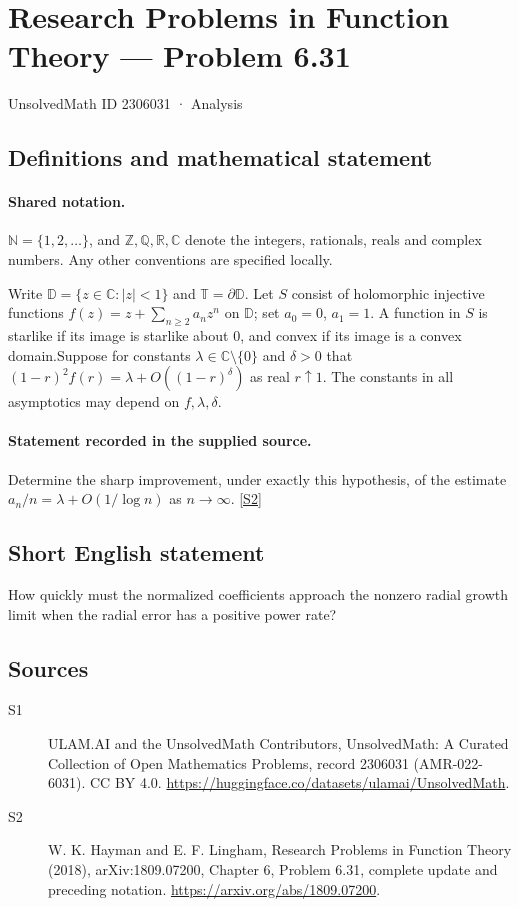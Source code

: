\documentclass[11pt]{article}
\newcommand{\sref}[2]{\hyperlink{source:#1:#2}{[S#2]}}
\begin{document}
\setcounter{section}{2306030}
\section{Research Problems in Function Theory — Problem 6.31}\label{2306031}
{\small\sffamily UnsolvedMath ID 2306031 · Analysis}
\subsection{Definitions and mathematical statement}

\paragraph{Shared notation.}$\mathbb N=\{1,2,\ldots\}$, and $\mathbb Z,\mathbb Q,\mathbb R,\mathbb C$ denote the integers, rationals, reals and complex numbers. Any other conventions are specified locally.


Write $\mathbb D=\{z\in\mathbb C:|z|<1\}$ and $\mathbb T=\partial\mathbb D$. Let $S$ consist of holomorphic injective functions $f(z)=z+\sum_{n\ge2}a_nz^n$ on $\mathbb D$; set $a_0=0$, $a_1=1$. A function in $S$ is starlike if its image is starlike about $0$, and convex if its image is a convex domain.Suppose for constants $\lambda\in\mathbb C\setminus\{0\}$ and $\delta>0$ that $(1-r)^2f(r)=\lambda+O((1-r)^\delta)$ as real $r\uparrow1$. The constants in all asymptotics may depend on $f,\lambda,\delta$.
\paragraph{Statement recorded in the supplied source.}
Determine the sharp improvement, under exactly this hypothesis, of the estimate $a_n/n=\lambda+O(1/\log n)$ as $n\to\infty$. \sref{2306031}{2}
\subsection{Short English statement}
How quickly must the normalized coefficients approach the nonzero radial growth limit when the radial error has a positive power rate?
\subsection{Sources}
\begin{description}
\item[\hypertarget{source:2306031:1}{S1}] ULAM.AI and the UnsolvedMath Contributors, UnsolvedMath: A Curated Collection of Open Mathematics Problems, record 2306031 (AMR-022-6031). CC BY 4.0. \url{https://huggingface.co/datasets/ulamai/UnsolvedMath}.
\item[\hypertarget{source:2306031:2}{S2}] W. K. Hayman and E. F. Lingham, Research Problems in Function Theory (2018), arXiv:1809.07200, Chapter 6, Problem 6.31, complete update and preceding notation. \url{https://arxiv.org/abs/1809.07200}.
\end{description}
\label{end:2306031}
\end{document}
